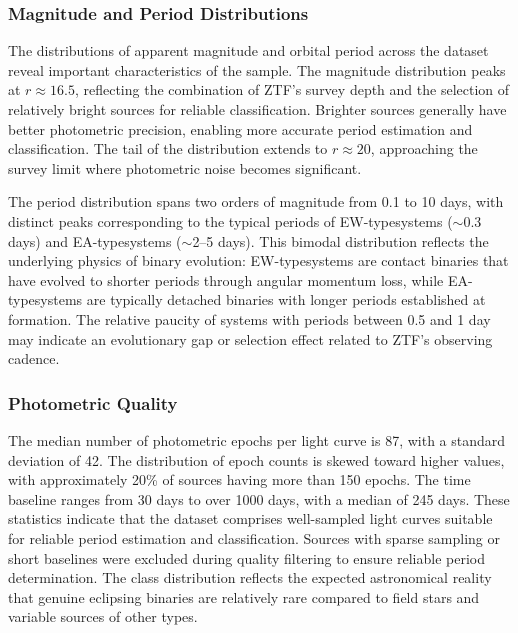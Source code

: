 \documentclass[11pt,a4paper]{article}
\newcommand{\EA}{EA-type}
\newcommand{\EW}{EW-type}
\begin{document}
\subsubsection{Magnitude and Period Distributions}

The distributions of apparent magnitude and orbital period across the dataset reveal important characteristics of the sample. The magnitude distribution peaks at $r \approx 16.5$, reflecting the combination of ZTF's survey depth and the selection of relatively bright sources for reliable classification. Brighter sources generally have better photometric precision, enabling more accurate period estimation and classification. The tail of the distribution extends to $r \approx 20$, approaching the survey limit where photometric noise becomes significant.

The period distribution spans two orders of magnitude from 0.1 to 10 days, with distinct peaks corresponding to the typical periods of \EW systems ($\sim$0.3 days) and \EA systems ($\sim$2--5 days). This bimodal distribution reflects the underlying physics of binary evolution: \EW systems are contact binaries that have evolved to shorter periods through angular momentum loss, while \EA systems are typically detached binaries with longer periods established at formation. The relative paucity of systems with periods between 0.5 and 1 day may indicate an evolutionary gap or selection effect related to ZTF's observing cadence.

\subsubsection{Photometric Quality}

The median number of photometric epochs per light curve is 87, with a standard deviation of 42. The distribution of epoch counts is skewed toward higher values, with approximately 20\% of sources having more than 150 epochs. The time baseline ranges from 30 days to over 1000 days, with a median of 245 days. These statistics indicate that the dataset comprises well-sampled light curves suitable for reliable period estimation and classification. Sources with sparse sampling or short baselines were excluded during quality filtering to ensure reliable period determination. The class distribution reflects the expected astronomical reality that genuine eclipsing binaries are relatively rare compared to field stars and variable sources of other types.
\end{document}
